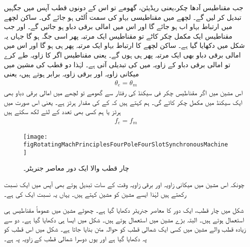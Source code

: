 جب مقناطیس آدھا چکر،یعنی  ریڈیئن،  گھومے تو اس کے دونوں  قطب آپس میں جگہیں تبدیل کر لیں گے۔ لچھے میں مقناطیسی بہاو کی سمت اُلٹی ہو جائے گی۔ ساکن لچھے میں ارتباط بہاو اب  ہو جائے گا اور اس میں امالی برقی دباو  ہو جائیں گے۔ اور جب مقناطیس ایک مکمل چکر کاٹے تو مقناطیس  ایک مرتبہ پھر اسی جگہ ہو گا جہاں یہ شکل میں دکھایا گیا ہے۔ ساکن لچھے کا ارتباط بہاو ایک مرتبہ پھر  ہی ہو گا اور اس میں امالی برقی دباو بھی ایک مرتبہ پھر  ہی ہوں گے۔ یعنی مقناطیس اگر  کا زاویہ طے کرے تو امالی برقی دباو کے زاویہ میں  کی تبدیلی آتی ہے۔ لہٰذا دو قطب کی مشین میں میکانی زاویہ  اور برقی زاویہ  برابر ہوتے ہیں، یعنی
\begin{align*}
\theta_e=\theta_m
\end{align*}
اس مشین میں اگر مقناطیس  چکر فی سیکنڈ کی رفتار سے گھومے تو لچھے میں امالی برقی دباو  بھی ایک سیکنڈ میں  مکمل چکر کاٹے گی۔ ہم کہتے ہیں کہ  کے     کی مقدار   ہرٹز ہے۔ یعنی اس صورت میں   ہرٹز  یا ہم کسی بھی تعدد کے لئے لکھ سکتے ہیں
\begin{align*}
f_e=f_m
\end{align*}
%
\begin{figure}
\centering
\texttt{[image: figRotatingMachPrinciplesFourPoleFourSlotSynchronousMachine]}
\caption{چار قطب والا ایک دور معاصر جنریٹر۔}
\label{شکل_گھومتے_مشین_چار_قطب_معاصر_مژین}
\end{figure}


چونکہ اس مشین میں  میکانی زاویہ  اور برقی زاویہ  وقت کے سات تبدیل ہوتے بھی آپس میں ایک نسبت رکھتے ہیں لہٰذا ایسے مشین کو  مشین  کہتے ہیں۔ یہاں یہ نسبت ایک کی ہے۔ 

شکل   میں چار قطب، ایک دور کا معاصر جنریٹر دکھایا گیا ہے۔ چھوٹے مشین میں عموماً مقناطیس ہی استعمال ہوتے ہیں۔ البتہ بڑے مشین میں  استعمال ہوتے ہیں۔ شکل   میں ایسا ہی دکھایا گیا ہے۔ دو سے زیادہ قطب والے مشین میں کسی ایک شمالی قطب کو حوالہ متن بنایا جاتا ہے۔ شکل میں اس قطب کو  پہ دکھایا گیا ہے اور یوں دوسرا شمالی قطب  کے زاویہ پہ ہے۔

